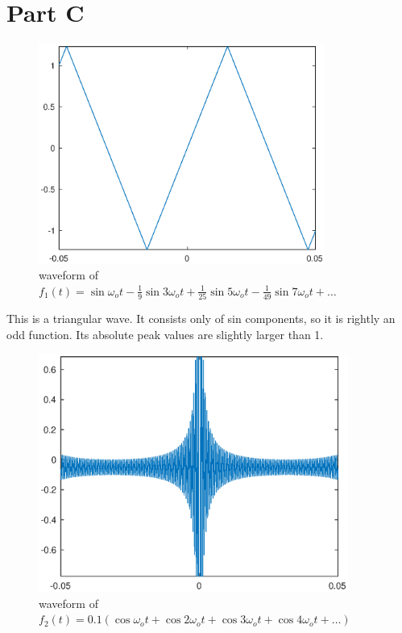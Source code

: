 \section*{Part C}



\begin{figure}[htbp]
  \centering
  \includegraphics [width=3.7in]{matlab/fig/C_r_a.eps}
  \caption{waveform of $f_1(t)=\sin\omega_o t - \frac{1}{9}\sin3\omega_o t + \frac{1}{25}\sin5\omega_o t - \frac{1}{49}\sin7\omega_o t + \dots$}    
  \label{fig:C_r_a}
\end{figure}

This is a triangular wave. It consists only of sin components, so it is rightly an odd function. Its absolute peak values are slightly larger than 1.



\begin{figure}[htbp]
  \centering
  \includegraphics [width=4in]{matlab/fig/C_r_b.eps}
  \caption{waveform of $f_2(t)=0.1(\cos\omega_o t + \cos2\omega_o t + \cos3\omega_o t + \cos4\omega_o t + \dots)$}    
  \label{fig:C_r_b}
\end{figure}

